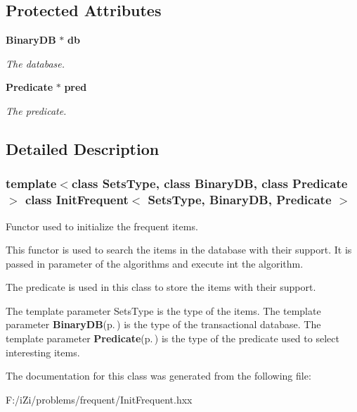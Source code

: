 \subsection*{Protected Attributes}
\begin{CompactItemize}
\item 
{\bf Binary\-DB} $\ast$ {\bf db}\label{class_init_frequent_86b635685b8d2a731805f276541a0985}

\begin{CompactList}\small\item\em The database. \item\end{CompactList}\item 
{\bf Predicate} $\ast$ {\bf pred}\label{class_init_frequent_5e3ffe3b474496e68eea25682e1f7f0b}

\begin{CompactList}\small\item\em The predicate. \item\end{CompactList}\end{CompactItemize}


\subsection{Detailed Description}
\subsubsection*{template$<$class Sets\-Type, class Binary\-DB, class Predicate$>$ class Init\-Frequent$<$ Sets\-Type, Binary\-DB, Predicate $>$}

Functor used to initialize the frequent items. 

This functor is used to search the items in the database with their support. It is passed in parameter of the algorithms and execute int the algorithm.

The predicate is used in this class to store the items with their support.

The template parameter Sets\-Type is the type of the items. The template parameter {\bf Binary\-DB}{\rm (p.\,\pageref{class_binary_d_b})} is the type of the transactional database. The template parameter {\bf Predicate}{\rm (p.\,\pageref{class_predicate})} is the type of the predicate used to select interesting items. 



The documentation for this class was generated from the following file:\begin{CompactItemize}
\item 
F:/i\-Zi/problems/frequent/Init\-Frequent.hxx\end{CompactItemize}
